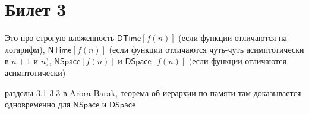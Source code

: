 \setcounter{section}{2}
\section{Билет 3}
	Это про строгую вложенность $\mathsf{DTime}[f(n)]$ (если функции отличаются на логарифм), $\mathsf{NTime}[f(n)]$ (если функции отличаются чуть-чуть асимптотически в $n+1$ и $n$),
	$\mathsf{NSpace}[f(n)]$ и $\mathsf{DSpace}[f(n)]$ (если функции отличаются асимптотически)

	\TODO разделы 3.1-3.3 в Arora-Barak, теорема об иерархии по памяти там доказывается одновременно для $\mathsf{NSpace}$ и $\mathsf{DSpace}$
